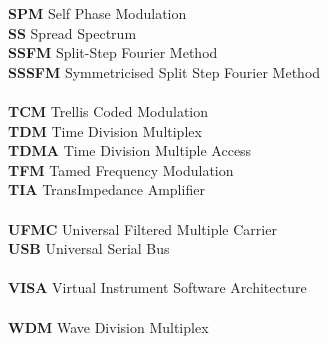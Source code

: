 \begin{multicols}{2}
\begin{tabbing}
\textbf{SPM}		\>	Self Phase Modulation							\\
\textbf{SS}			\>	Spread Spectrum									\\
\textbf{SSFM}		\>	Split-Step Fourier Method						\\
\textbf{SSSFM}		\>	Symmetricised Split Step Fourier Method			\\
\\
\textbf{TCM}		\>	Trellis Coded Modulation						\\
\textbf{TDM}		\>	Time Division Multiplex							\\
\textbf{TDMA}		\>	Time Division Multiple Access					\\
\textbf{TFM}		\>	Tamed Frequency Modulation						\\
\textbf{TIA}		\>	TransImpedance Amplifier						\\
\\
\textbf{UFMC}		\>	Universal Filtered Multiple Carrier				\\
\textbf{USB}		\>	Universal Serial Bus							\\
\\
\textbf{VISA}		\>	Virtual Instrument Software Architecture		\\
\\
\textbf{WDM}		\>	Wave Division Multiplex							\\
\end{tabbing}
%
\end{multicols}
\normalsize

